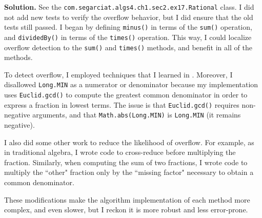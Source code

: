 \documentclass[12pt, a4paper]{article}
\newenvironment{sol}[1][Solution]
{\par\medskip\noindent \textbf{#1.} }
{\medskip}
\begin{document}
	\begin{sol}
		See the \texttt{com.segarciat.algs4.ch1.sec2.ex17.Rational} class. I did not add
		new tests to verify the overflow behavior, but I did ensure that the old tests
		still passed. I began by defining \texttt{minus()} in terms of the \texttt{sum()}
		operation, and \texttt{dividedBy()} in terms of the \texttt{times()} operation.
		This way, I could localize overflow detection to the \texttt{sum()} and \texttt{times()}
		methods, and benefit in all of the methods.
		
		To detect overflow, I employed techniques that I learned in \cite{csapp}. Moreover,
		I disallowed \texttt{Long.MIN} as a numerator or denominator because my implementation
		uses \texttt{Euclid.gcd()} to compute the greatest common denominator in order to express
		a fraction in lowest terms. The issue is that \texttt{Euclid.gcd()} requires non-negative
		arguments, and that \texttt{Math.abs(Long.MIN)} is \texttt{Long.MIN} (it remains negative).
		
		I also did some other work to reduce the likelihood of overflow. For example, as in
		traditional algebra, I wrote code to cross-reduce before multiplying the fraction.
		Similarly, when computing the sum of two fractions, I wrote code to multiply the ``other"
		fraction only by the ``missing factor" necessary to obtain a common denominator.
		
		These modifications make the algorithm implementation of each method more complex,
		and even slower, but I reckon it is more robust and less error-prone.
	\end{sol}
	\pagebreak
	\printbibliography
\end{document}
